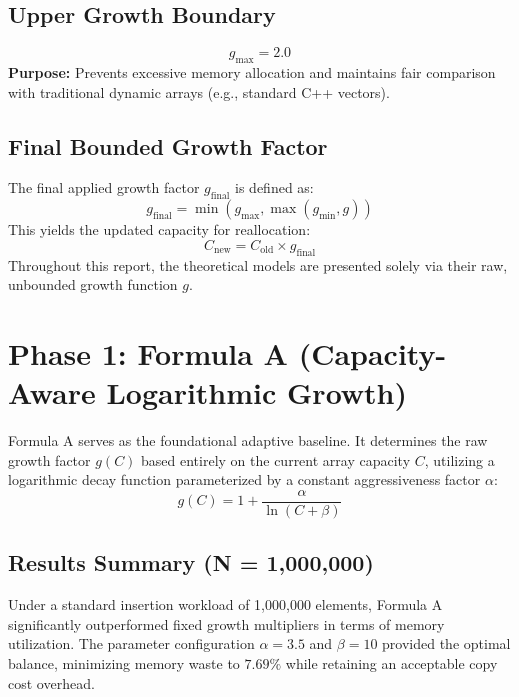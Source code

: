 \documentclass{article}
\begin{document}
\subsection{Upper Growth Boundary}
\begin{equation}
g_{\max} = 2.0
\end{equation}
\textbf{Purpose:} Prevents excessive memory allocation and maintains fair comparison with traditional dynamic arrays (e.g., standard C++ vectors).

\subsection{Final Bounded Growth Factor}
The final applied growth factor $g_{\text{final}}$ is defined as:
\begin{equation}
g_{\text{final}} = \min\left(g_{\max}, \max\left(g_{\min}, g\right)\right)
\end{equation}
This yields the updated capacity for reallocation:
\begin{equation}
C_{\text{new}} = C_{\text{old}} \times g_{\text{final}}
\end{equation}
Throughout this report, the theoretical models are presented solely via their raw, unbounded growth function $g$.

\section{Phase 1: Formula A (Capacity-Aware Logarithmic Growth)}
Formula A serves as the foundational adaptive baseline. It determines the raw growth factor $g(C)$ based entirely on the current array capacity $C$, utilizing a logarithmic decay function parameterized by a constant aggressiveness factor $\alpha$:
\begin{equation}
g(C) = 1 + \frac{\alpha}{\ln(C+\beta)}
\end{equation}

\subsection{Results Summary (N = 1,000,000)}
Under a standard insertion workload of 1,000,000 elements, Formula A significantly outperformed fixed growth multipliers in terms of memory utilization. The parameter configuration $\alpha=3.5$ and $\beta=10$ provided the optimal balance, minimizing memory waste to $7.69\%$ while retaining an acceptable copy cost overhead.
\end{document}

